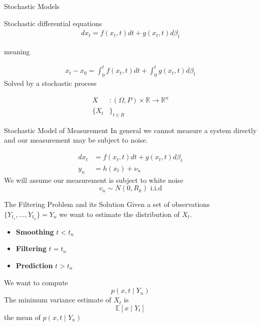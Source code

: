 \documentclass{beamer}
\newcommand{\R}{\mathbb{R}} \newcommand{\E}{\operatorname{E}}
\begin{document}
\begin{frame}{Stochastic Models}

    \pause
    Stochastic differential equations
    \begin{align}
      dx_t = f(x_t,t) dt + g(x_t,t) d\beta_t
    \end{align}

    meaning

    \begin{align}
      x_t - x_0 = \int_0^tf(x_t,t) dt + \int_0^tg(x_t,t) d\beta_t
    \end{align}
    \pause
    Solved by a stochastic process

    \begin{align}
      X &: (\Omega,P) \times \R \to \R^n \\
      \{X_t &\}_{t\in R} 
    \end{align}
  


\end{frame}

\begin{frame}{Stochastic Model of Measurement}
  In general we cannot measure a system directly and our measurement may be
  subject to noise.

  \pause

  \begin{align}
    dx_t &= f(x_t,t) dt + g(x_t,t) d\beta_t \\
    y_n  &= h(x_t) + \nu_n
  \end{align}
  \pause We will assume our measurement is subject to white noise
  \begin{equation}
    v_n \sim N(0,R_k) \text{ i.i.d}
  \end{equation}
\end{frame}

\begin{frame}{The Filtering Problem and its Solution}
  Given a set of observations $\{Y_{t_1},\dots,Y_{t_n}\} = Y_{n}$ we want to
  estimate the distribution of $X_t$.

  \pause
  \begin{itemize}
    \pause
  \item \textbf{Smoothing} $t < t_n$ \pause
  \item \textbf{Filtering} $t = t_n$ \pause
  \item \textbf{Prediction} $t > t_n$
  \end{itemize}

  \pause We want to compute
  \begin{equation}
    p(x,t \mid Y_n)
  \end{equation}
  \pause The minimum variance estimate of $X_t$ is
  \begin{equation}
    \mathbb{E}[x \mid Y_t]
  \end{equation}
  the mean of $p(x,t \mid Y_{n})$
\end{frame}
\end{document}
